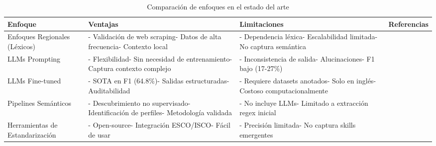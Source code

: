 \begin{table}[H]
\centering
\caption{Comparación de enfoques en el estado del arte}
\label{tab:estado-arte-comparativo}
\begin{tabular}{|p{3cm}|p{4cm}|p{4cm}|p{3cm}|}
\hline
\textbf{Enfoque} & \textbf{Ventajas} & \textbf{Limitaciones} & \textbf{Referencias} \\
\hline
Enfoques Regionales (Léxicos) & - Validación de web scraping\newline - Datos de alta frecuencia\newline - Contexto local & - Dependencia léxica\newline - Escalabilidad limitada\newline - No captura semántica & \parencite{rubio2025, aguilera2018, martinez2024} \\
\hline
LLMs Prompting & - Flexibilidad\newline - Sin necesidad de entrenamiento\newline - Captura contexto complejo & - Inconsistencia de salida\newline - Alucinaciones\newline - F1 bajo (17-27\%) & \parencite{nguyen2024} \\
\hline
LLMs Fine-tuned & - SOTA en F1 (64.8\%)\newline - Salidas estructuradas\newline - Auditabilidad & - Requiere datasets anotados\newline - Solo en inglés\newline - Costoso computacionalmente & \parencite{herandi2024, zhang2022} \\
\hline
Pipelines Semánticos & - Descubrimiento no supervisado\newline - Identificación de perfiles\newline - Metodología validada & - No incluye LLMs\newline - Limitado a extracción regex inicial & \parencite{lukauskas2023} \\
\hline
Herramientas de Estandarización & - Open-source\newline - Integración ESCO/ISCO\newline - Fácil de usar & - Precisión limitada\newline - No captura skills emergentes & \parencite{kavargyris2025} \\
\hline
\end{tabular}
\end{table}

